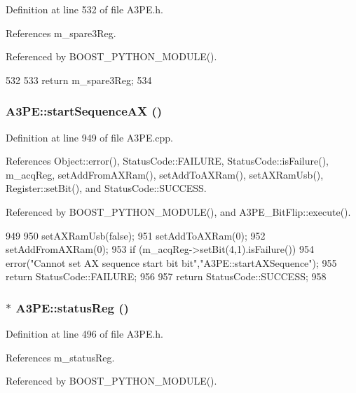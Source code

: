 Definition at line 532 of file A3PE.h.

References m\_\-spare3Reg.

Referenced by BOOST\_\-PYTHON\_\-MODULE().


\begin{DoxyCode}
532                        {
533     return m_spare3Reg;
534   }
\end{DoxyCode}
\hypertarget{classA3PE_a91ae249ca14676f8b0832487955fcf8c}{
\subsubsection[{startSequenceAX}]{ A3PE::startSequenceAX ()}}
\label{classA3PE_a91ae249ca14676f8b0832487955fcf8c}


Definition at line 949 of file A3PE.cpp.

References Object::error(), StatusCode::FAILURE, StatusCode::isFailure(), m\_\-acqReg, setAddFromAXRam(), setAddToAXRam(), setAXRamUsb(), Register::setBit(), and StatusCode::SUCCESS.

Referenced by BOOST\_\-PYTHON\_\-MODULE(), and A3PE\_\-BitFlip::execute().


\begin{DoxyCode}
949                                 {
950   setAXRamUsb(false);
951   setAddToAXRam(0);
952   setAddFromAXRam(0);
953   if (m_acqReg->setBit(4,1).isFailure()){
954     error("Cannot set AX sequence start bit bit","A3PE::startAXSequence");
955     return StatusCode::FAILURE;
956   }
957   return StatusCode::SUCCESS;
958 }
\end{DoxyCode}
\hypertarget{classA3PE_af260fc8bce78935b7bad57c987574683}{
\subsubsection[{statusReg}]{$\ast$ A3PE::statusReg ()}}
\label{classA3PE_af260fc8bce78935b7bad57c987574683}


Definition at line 496 of file A3PE.h.

References m\_\-statusReg.

Referenced by BOOST\_\-PYTHON\_\-MODULE().


